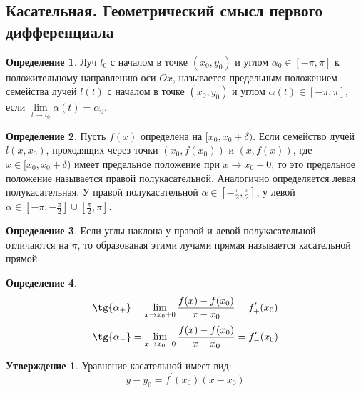 \documentclass[a4paper, 12pt]{article}
\newcommand\tab[1][.5cm]{\hspace*{#1}}
\theoremstyle{definition}
\newtheorem*{definition}{Определение}
\newtheorem*{statement}{Утверждение}
\begin{document}
    \subsection{Касательная. Геометрический смысл первого дифференциала}
        \begin{definition}
            Луч $l_0$ с началом в точке $(x_0,y_0)$ и углом $\alpha_0\in [-\pi,\pi]$ к положительному направлению оси $Ox$, называется предельным положением семейства лучей $l(t)$ с началом в точке $(x_0, y_0)$ и углом $\alpha(t)\in [-\pi,\pi]$, если $\lim\limits_{t\to t_0}\alpha(t)=\alpha_0$.
        \end{definition} 
        \begin{definition}
            Пусть $f(x)$ определена на $[x_0, x_0+\delta)$. Если семейство лучей $l(x,x_0)$, проходящих через точки $(x_0,f(x_0))$ и $(x, f(x))$, где $x\in [x_0, x_0+\delta)$ имеет предельное положение при $x\to x_0+0$, то это предельное положение называется правой полукасательной. Аналогично определяется левая полукасательная.         У правой полукасательной $\alpha\in [-\frac{\pi}{2}, \frac{\pi}{2}]$, у левой $\alpha\in [-\pi,-\frac{\pi}{2}]\cup[\frac{\pi}{2},\pi]$.
        \end{definition} 
        \begin{definition}
            Если углы наклона у правой и левой полукасательной отличаются на $\pi$, то образованая этими лучами прямая называется касательной прямой.
        \end{definition} 
        \begin{definition}\tab
            \[\tg{\alpha_+}=\lim\limits_{x\to x_0+0}\frac{f(x)-f(x_0)}{x-x_0}=f^{\prime}_+(x_0)\]
            \[\tg{\alpha_-}=\lim\limits_{x\to x_0-0}\frac{f(x)-f(x_0)}{x-x_0}=f^{\prime}_-(x_0)\]
        \end{definition} 
        \begin{statement}
            Уравнение касательной имеет вид:
            \[y-y_0=f^{\prime}(x_0)(x-x_0)\]
        \end{statement} 
\end{document}
